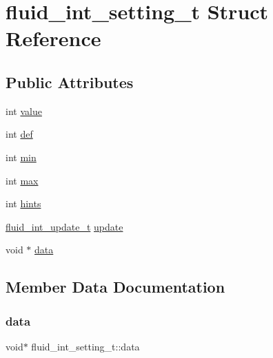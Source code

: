 \hypertarget{structfluid__int__setting__t}{}\section{fluid\+\_\+int\+\_\+setting\+\_\+t Struct Reference}
\label{structfluid__int__setting__t}
\subsection*{Public Attributes}
\begin{DoxyCompactItemize}
\item 
int \hyperlink{structfluid__int__setting__t_a1adf9449feb77990049e6ec53bc372d4}{value}
\item 
int \hyperlink{structfluid__int__setting__t_a0e42ddc243f1b73cee64f97611bdc9b9}{def}
\item 
int \hyperlink{structfluid__int__setting__t_a0b7fa3ce56f8ef5272414588fe220407}{min}
\item 
int \hyperlink{structfluid__int__setting__t_a4940d2f386ecd32e8ed295fc15fa685a}{max}
\item 
int \hyperlink{structfluid__int__setting__t_ad8853243c1be84a7a5c984aae04c3ab4}{hints}
\item 
\hyperlink{fluid__settings_8h_a587ba97e58a30be87d4ce53367f891f5}{fluid\+\_\+int\+\_\+update\+\_\+t} \hyperlink{structfluid__int__setting__t_af92c12c973bd9cf3aa18d6cfa1120081}{update}
\item 
void $\ast$ \hyperlink{structfluid__int__setting__t_a1c666493d33dc5b2a01d610c03e3e9d4}{data}
\end{DoxyCompactItemize}


\subsection{Member Data Documentation}
\mbox{\label{structfluid__int__setting__t_a1c666493d33dc5b2a01d610c03e3e9d4}} 
\subsubsection{\texorpdfstring{data}{data}}
{\footnotesize\ttfamily void$\ast$ fluid\+\_\+int\+\_\+setting\+\_\+t\+::data}


